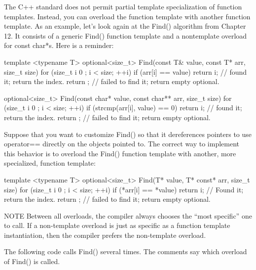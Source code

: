 The C++ standard does not permit partial template specialization of function templates. Instead, you can overload the function template with another function template. As an example, let’s look again at the Find() algorithm from Chapter 12. It consists of a generic Find() function template and a nontemplate overload for const char*s. Here is a reminder:

\begin{cpp}
template <typename T>
optional<size_t> Find(const T& value, const T* arr, size_t size)
{
    for (size_t i { 0 }; i < size; ++i) {
        if (arr[i] == value) {
            return i; // found it; return the index.
        }
    }
    return {}; // failed to find it; return empty optional.
}

optional<size_t> Find(const char* value, const char** arr, size_t size)
{
    for (size_t i { 0 }; i < size; ++i) {
        if (strcmp(arr[i], value) == 0) {
            return i; // found it; return the index.
        }
    }
    return {}; // failed to find it; return empty optional.
}
\end{cpp}

Suppose that you want to customize Find() so that it dereferences pointers to use operator== directly on the objects pointed to. The correct way to implement this behavior is to overload the Find() function template with another, more specialized, function template:

\begin{cpp}
template <typename T>
optional<size_t> Find(T* value, T* const* arr, size_t size)
{
    for (size_t i { 0 }; i < size; ++i) {
        if (*arr[i] == *value) {
            return i; // Found it; return the index.
        }
    }
    return {}; // failed to find it; return empty optional.
}
\end{cpp}

\begin{myNotic}{NOTE}
 Between all overloads, the compiler always chooses the “most specific” one to call. If a non-template overload is just as specific as a function template instantiation, then the compiler prefers the non-template overload.
\end{myNotic}

The following code calls Find() several times. The comments say which overload of Find() is called.

